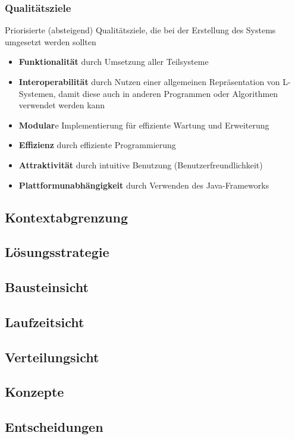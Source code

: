 \documentclass[11pt]{article}
\begin{document}
    \subsubsection{Qualitätsziele}
    Priorisierte (absteigend) Qualitätsziele, die bei der Erstellung des Systems umgesetzt werden sollten
    \begin{itemize}
        \item \textbf{Funktionalität} durch Umsetzung aller Teilsysteme
        \item \textbf{Interoperabilität} durch Nutzen einer allgemeinen Repräsentation von L-Systemen, damit diese
        auch in anderen Programmen oder Algorithmen verwendet werden kann
        \item \textbf{Modular}e Implementierung für effiziente Wartung und Erweiterung
        \item \textbf{Effizienz} durch effiziente Programmierung
        \item \textbf{Attraktivität} durch intuitive Benutzung (Benutzerfreundlichkeit)
        \item \textbf{Plattformunabhängigkeit} durch Verwenden des Java-Frameworks
    \end{itemize}

    \subsection{Kontextabgrenzung}
    \subsection{Lösungsstrategie}
    \subsection{Bausteinsicht}
    \subsection{Laufzeitsicht}
    \subsection{Verteilungsicht}
    \subsection{Konzepte}
    \subsection{Entscheidungen}
\end{document}
